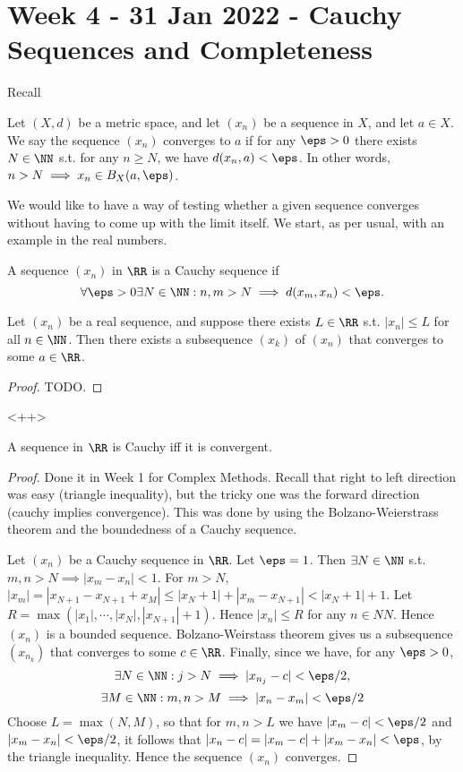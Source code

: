 \section{Week 4 - 31 Jan 2022 - Cauchy Sequences and Completeness}
Recall
\begin{definition} 
  Let $(X,d)$ be a metric space, and let $(x_n)$ be a sequence in $X$, and let
  $a\in X$. We say the sequence $(x_n)$ converges to $a$ if for any $\eps>0$
  there exists $N\in\NN$ s.t. for any $n\geq N$, we have $d(x_n,a)<\eps$. In
  other words, $n>N\implies x_n\in B_{X}(a,\eps)$.
  \label{<+label+>}
\end{definition}
We would like to have a way of testing whether a given sequence converges
without having to come up with the limit itself. We start, as per usual, with an
example in the real numbers.

\begin{definition}
  A sequence $(x_n)$ in $\RR$ is a Cauchy sequence if 
  \[\forall\eps>0 \exists N\in\NN : n,m>N \implies d(x_m,x_n)<\eps.\]
  \label{def:cauchyRR}
\end{definition}

\begin{lemma}
  Let $(x_n)$ be a real sequence, and suppose there exists $L\in\RR$ s.t.
  $|x_n|\leq L$ for all $n\in\NN$. Then there exists a subsequence $(x_k)$ of
  $(x_n)$ that converges to some $a\in\RR$.
  \label{<+label+>}
\end{lemma}
\begin{proof}
  TODO.
\end{proof}<++>

\begin{theorem}
  A sequence in $\RR$ is Cauchy iff it is convergent.
\end{theorem}
\begin{proof}
  Done it in Week 1 for Complex Methods. Recall that right to left direction was
  easy (triangle inequality), but the tricky one was the forward direction
  (cauchy implies convergence). This was done by using the Bolzano-Weierstrass
  theorem and the boundedness of a Cauchy sequence.

  Let $(x_n)$ be a Cauchy sequence in $\RR$. Let $\eps=1$. Then $\exists
  N\in\NN$ s.t. $m,n>N \implies |x_m-x_n|<1$. For $m>N$,
  $|x_m|=|x_{N+1}-x_{N+1}+x_M| \leq |x_N+1| + |x_m-x_{N+1}| < |x_N+1|+1$.
  Let $R=\max (|x_1|,\cdots, |x_N|, |x_{N+1}|+1)$. Hence $|x_n|\leq R$ for any
  $n\in NN$. Hence $(x_n)$ is a bounded sequence. Bolzano-Weirstass theorem
  gives us a subsequence $(x_{n_k})$ that converges to some $c\in\RR$. Finally,
  since we have, for any $\eps>0$,
  \[\exists N\in\NN : j>N \implies |x_{n_j} - c| < \eps/2, \]
  \[\exists M\in\NN : m,n>M \implies |x_n-x_m|< \eps/2\]
  Choose $L=\max (N,M)$, so that for $m,n>L$ we have $|x_m-c|<\eps/2$ and
  $|x_m-x_n|<\eps/2$, it follows that $|x_n-c|=|x_m-c|+|x_m-x_n| < \eps$, by the
  triangle inequality. Hence the sequence $(x_n)$ converges.

\end{proof}

